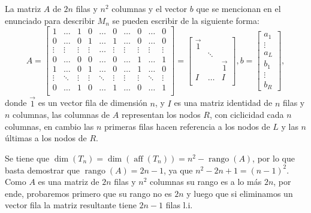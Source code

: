 \documentclass{article}
\newcommand{\rango}{\operatorname{rango}}
\newcommand{\aff}{\operatorname{aff}}
\theoremstyle{plain}
\theoremstyle{definition}
\theoremstyle{Azul}
\begin{document}
\begin{enumerate}
La matriz $A$ de $2n$ filas y $n^{2}$ columnas y el vector $b$ que se mencionan en el enunciado para describir $M_{n}$ se pueden escribir de la siguiente forma:
 \[
A =
 \begin{bmatrix}
	1        &\dots     &1       &0     	&\dots     &0        &\dots     &0     	&\dots     &0       \\
	0        &\dots     &0       &1     	&\dots     &1        &\dots     &0     	&\dots     &0       \\
	\vdots   &\vdots    &\vdots  &\vdots	&\dots     &\vdots   &\vdots    &\vdots & \vdots   &\vdots  \\   
	0        &\dots     &0       &0    		&\dots     &0        &\dots     &1      &\dots     &1       \\
	1        &\dots     &0       &1         &\dots     &0        &\dots		&1      &\dots 	   &0		\\
	\vdots 	 &\ddots    &\vdots  &\vdots    &\ddots    &\vdots    &\vdots	&\vdots &\ddots    &\vdots  \\
	0        &\dots     &1       &0         &\dots     &1        &\dots		&0      &\dots     &1 		\\
\end{bmatrix}
=
\begin{bmatrix}
	\vec{1}   	&  			&		\\
			  	&\ddots 	&		\\
	   			&			&\vec{1}    \\
	I         	&\dots     	&I			\\
\end{bmatrix},
b = 
\begin{bmatrix}
	a_{1}\\
	\vdots\\
	a_{L}\\
	b_{1}\\
	\vdots\\
	b_{R}
\end{bmatrix},
\]
donde $\vec{1}$ es un vector fila de dimensión $n$, y $I$ es una matriz identidad de $n$ filas y $n$ columnas, las columnas de $A$ representan los nodos $R$, con ciclicidad cada $n$ columnas, en cambio las $n$ primeras filas hacen referencia a los nodos de $L$ y las $n$ últimas a los nodos de $R$.

Se tiene que $\dim(T_n) = \dim(\aff(T_n)) = n^{2}-\rango(A)$, por lo que basta demostrar que $\rango(A)=2n-1$, ya que $n^{2}-2n+1 = (n-1)^{2}$. Como $A$ es una matriz de $2n$ filas y $n^{2}$ columnas su rango es a lo más $2n$, por ende, probaremos primero que su rango no es $2n$ y luego que si eliminamos un vector fila la matriz resultante tiene $2n-1$ filas l.i.  


\end{enumerate}
\end{document}
